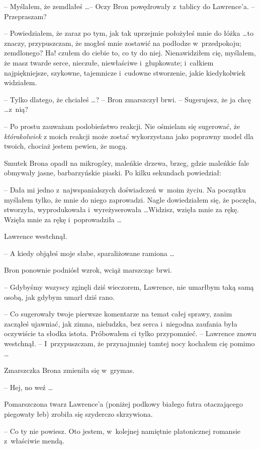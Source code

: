 \documentclass[oneside,polish,11pt,rmheadings]{mwbk}
\begin{document}
-- Myślałem, że zemdlałeś \ldots  -- Oczy Bron powędrowały z~tablicy do Lawrence'a. -- Przepraszam? 

-- Powiedziałem, że zaraz po tym, jak tak uprzejmie położyłeś mnie do łóżka \ldots  to znaczy, przypuszczam, że mogłeś mnie zostawić na podłodze w~przedpokoju; zemdlonego? Ha! czułem do ciebie to, co ty do niej. Nienawidziłem cię, myślałem, że masz twarde serce, nieczułe, niewłaściwe i~głupkowate; i~całkiem najpiękniejsze, szykowne, tajemnicze i~cudowne stworzenie, jakie kiedykolwiek widziałem. 

-- Tylko dlatego, że chciałeś \ldots ? -- Bron zmarszczył brwi. -- Sugerujesz, że ja chcę \ldots  z~nią? 

-- Po prostu zauważam podobieństwo reakcji. Nie ośmielam się sugerować, że \textit{którakolwiek }z moich reakcji może zostać wykorzystana jako poprawny model dla twoich, chociaż jestem pewien, że mogą. 

Smutek Brona opadł na mikrogóry, maleńkie drzewa, brzeg, gdzie maleńkie fale obmywały jasne, barbarzyńskie piaski.  Po kilku sekundach powiedział: 

-- Dała mi jedno z~najwspanialszych doświadczeń w~moim życiu. Na początku myślałem tylko, że mnie do niego zaprowadzi. Nagle dowiedziałem się, że poczęła, stworzyła, wyprodukowała i~wyreżyserowała \ldots  Widzisz, wzięła mnie za rękę. Wzięła mnie za rękę i~poprowadziła \ldots  

Lawrence westchnął. 

-- A kiedy objąłeś moje słabe, sparaliżowane ramiona \ldots  

Bron ponownie podniósł wzrok, wciąż marszcząc brwi.

 -- Gdybyśmy wszyscy zginęli dziś wieczorem, Lawrence, nie umarłbym taką samą osobą, jak gdybym umarł dziś rano. 

-- Co sugerowały twoje pierwsze komentarze na temat całej sprawy, zanim zacząłeś ujawniać, jak zimna, nieludzka, bez serca i~niegodna zaufania była oczywiście ta słodka istota. Próbowałem ci tylko przypomnieć. -- Lawrence znowu westchnął. -- I~przypuszczam, że przynajmniej tamtej nocy kochałem cię pomimo \ldots  

Zmarszczka Brona zmieniła się w~grymas. 

-- Hej, no weź \ldots  

Pomarszczona twarz Lawrence'a (poniżej podkowy białego futra otaczającego piegowaty łeb) zrobiła się szyderczo skrzywiona.

-- Co ty nie powiesz. Oto jestem, w~kolejnej namiętnie platonicznej romansie z~właściwie mendą. 
\end{document}
